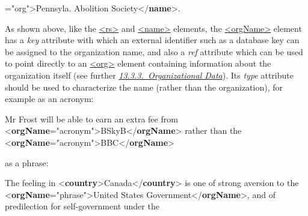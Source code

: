 \begin{shaded}
{\hspace*{1em}{type}="{org}">}Pennsyla. Abolition Society{</\textbf{name}>}.\end{shaded}\egroup\par \noindent  As shown above, like the \hyperref[TEI.rs]{<rs>} and \hyperref[TEI.name]{<name>} elements, the \hyperref[TEI.orgName]{<orgName>} element has a {\itshape key} attribute with which an external identifier such as a database key can be assigned to the organization name, and also a {\itshape ref} attribute which can be used to point directly to an \hyperref[TEI.org]{<org>} element containing information about the organization itself (see further \textit{\hyperref[ND-org]{13.3.3.\ Organizational Data}}). Its {\itshape type} attribute should be used to characterize the name (rather than the organization), for example as an acronym: \par\bgroup{}\exampleFont \begin{shaded}\noindent\mbox{}Mr Frost will be able to earn an\mbox{}\newline 
 extra fee from {<\textbf{orgName}\hspace*{1em}{type}="{acronym}">}BSkyB{</\textbf{orgName}>} rather than the \mbox{}\newline 
{<\textbf{orgName}\hspace*{1em}{type}="{acronym}">}BBC{</\textbf{orgName}>}\end{shaded}\egroup\par \noindent  as a phrase: \par\bgroup{}\exampleFont \begin{shaded}\noindent\mbox{} The feeling in\mbox{}\newline 
{<\textbf{country}>}Canada{</\textbf{country}>} is one of strong aversion to the {<\textbf{orgName}\hspace*{1em}{type}="{phrase}">}United States Government{</\textbf{orgName}>},\mbox{}\newline 
 and of predilection for self-government under the \mbox{}\newline 

\end{shaded}
